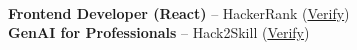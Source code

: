 \\
\textbf{Frontend Developer (React)} -- HackerRank (\href{https://www.hackerrank.com/certificates/72e9b1a58a2e}{Verify}) \\
\textbf{GenAI for Professionals} -- Hack2Skill (\href{https://certificate.hack2skill.com/verify/2026H2S05GCGENAIAPACC1-P01309}{Verify})
